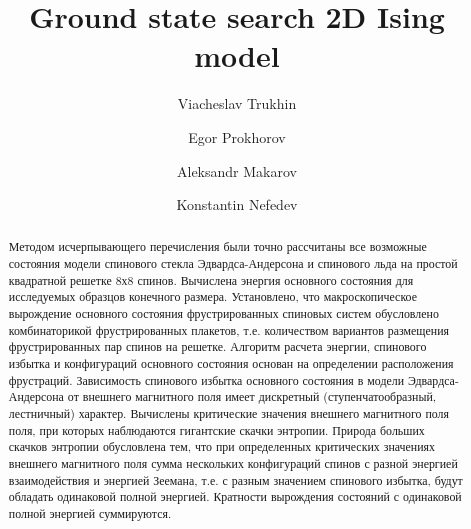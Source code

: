 \documentclass[utf8, babel, sor, jor, amsmath, amssymb, reprint]{elsarticle} %
\begin{document}
\begin{frontmatter}


\title{Ground state search 2D Ising model}

\author[mainaddress, secondaryaddress]{Viacheslav Trukhin}

\author[mainaddress]{Egor Prokhorov}

\author[mainaddress, secondaryaddress]{Aleksandr Makarov}

\author[mainaddress, secondaryaddress]{Konstantin Nefedev}


\address[mainaddress]{Far Eastern Federal University, Vladivostok, Russky Island, 10 Ajax Bay, 690922, the Russian Federation}
\address[secondaryaddress]{Institute of Applied Mathematics, Far Eastern Branch, Russian Academy of Science, Vladivostok, Radio 7, 690041, the Russian Federation}

\begin{abstract}

Методом исчерпывающего перечисления были точно рассчитаны все возможные состояния модели спинового стекла Эдвардса-Андерсона и спинового льда на простой квадратной решетке 8х8 спинов. Вычислена энергия основного состояния для исследуемых образцов конечного размера. Установлено, что макроскопическое вырождение основного состояния фрустрированных спиновых систем обусловлено комбинаторикой фрустрированных плакетов, т.е. количеством вариантов размещения фрустрированных пар спинов на решетке. Алгоритм расчета энергии, спинового избытка и конфигураций основного состояния основан на определении расположения фрустраций. Зависимость спинового избытка основного состояния в модели Эдвардса-Андерсона от внешнего магнитного поля имеет дискретный (ступенчатообразный, лестничный) характер. Вычислены критические значения внешнего магнитного поля поля, при которых наблюдаются гигантские скачки энтропии. Природа больших скачков энтропии обусловлена тем, что при определенных критических значениях внешнего магнитного поля сумма нескольких конфигураций спинов с разной энергией взаимодействия и энергией Зеемана, т.е. с разным значением спинового избытка, будут обладать одинаковой полной энергией. Кратности вырождения состояний с одинаковой полной энергией суммируются.  

\end{abstract}



\end{frontmatter}
\end{document}
